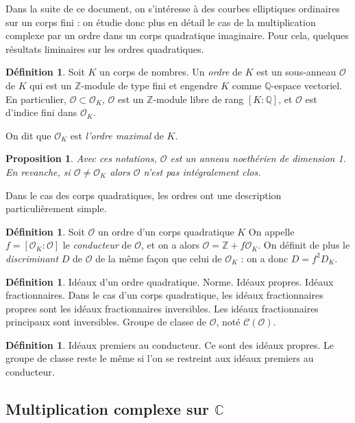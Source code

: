 \documentclass[11pt,a4paper]{article}
\newcommand{\Z}{\mathbb{Z}}
\newcommand{\C}{\mathbb{C}}
\newcommand{\Q}{\mathbb{Q}}
\renewcommand{\O}{\mathcal{O}}
\newcommand{\Cl}{\mathcal{C}}
\newtheorem{prop}[thm]{Proposition}
\theoremstyle{definition}
\newtheorem{defi}[thm]{Définition}
\begin{document}
Dans la suite de ce document, on s'intéresse à des courbes elliptiques ordinaires sur un corps fini : on étudie donc plus en détail le cas de la multiplication complexe par un ordre dans un corps quadratique imaginaire. Pour cela, quelques résultats liminaires sur les ordres quadratiques.


\begin{defi}
Soit $K$ un corps de nombres. Un \emph{ordre} de $K$ est un sous-anneau $\O$ de $K$ qui est un $\Z$-module de type fini et engendre $K$ comme $\Q$-espace vectoriel. En particulier, $\O\subset \O_K$, $\O$ est un $\Z$-module libre de rang $[K:\Q]$, et $\O$ est d'indice fini dans $\O_K$.

On dit que $\O_K$ est \emph{l'ordre maximal} de $K$.
\end{defi}

\begin{prop}
Avec ces notations, $\O$ est un anneau noethérien de dimension 1. En revanche, si $\O\neq \O_K$ alors $\O$ n'est pas intégralement clos.
\end{prop}

Dans le cas des corps quadratiques, les ordres ont une description particulièrement simple.

\begin{defi}
Soit $\O$ un ordre d'un corps quadratique $K$ On appelle $f=[\O_K:\O]$ le \emph{conducteur} de $\O$, et on a alors $\O=\Z+f \O_K$. On définit de plus le \emph{discriminant} $D$ de $\O$ de la même façon que celui de $\O_K$ : on a donc $D=f^2 D_K$.
\end{defi}

\begin{defi}
Idéaux d'un ordre quadratique. Norme. Idéaux propres. Idéaux fractionnaires. Dans le cas d'un corps quadratique, les idéaux fractionnaires propres sont les idéaux fractionnaires inversibles. Les idéaux fractionnaires principaux sont inversibles. Groupe de classe de $\O$, noté $\Cl(\O)$.
\end{defi}

\begin{defi}
Idéaux premiers au conducteur. Ce sont des idéaux propres. Le groupe de classe reste le même si l'on se restreint aux idéaux premiers au conducteur.
\end{defi}



\subsection{Multiplication complexe sur $\C$}
\end{document}

